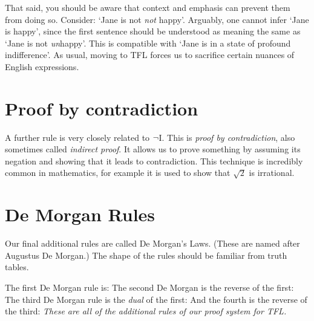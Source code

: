 That said, you should be aware that context and emphasis can prevent them from doing so. Consider: `Jane is not \emph{not} happy'. Arguably, one cannot infer `Jane is happy', since the first sentence should be understood as meaning the same as  `Jane is not \emph{un}happy'. This is compatible with `Jane is in a state of profound indifference'. As usual, moving to TFL forces us to sacrifice certain nuances of English expressions.

\section{Proof by contradiction}
A further rule is very closely related to $\neg$I. This is \emph{proof by contradiction}, also sometimes called \emph{indirect proof}. It allows us to prove something by assuming its negation and showing that it leads to contradiction. This technique is incredibly common in mathematics, for example it is used to show that $\sqrt{2}$ is irrational. 


\section{De Morgan Rules}
Our final additional rules are called De Morgan's Laws. (These are named after Augustus De Morgan.) The shape of the rules should be familiar from truth tables.

The first De Morgan rule is:
The second De Morgan is the reverse of the first:
The third De Morgan rule is the \emph{dual} of the first:
And the fourth is the reverse of the third:
\emph{These are all of the additional rules of our proof system for TFL.}

